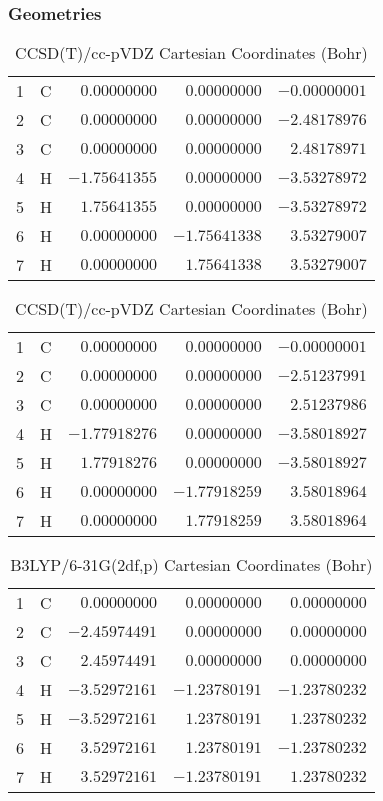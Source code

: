 \documentclass[10pt,oneside]{article}
\begin{document}
\begin{table}[h!]
\subsubsection*{Geometries}
\begin{multicols}{2}
\centering
\caption{CCSD(T)/cc-pVTZ Cartesian Coordinates (Bohr)}
\begin{tabular}{llrrr}
\toprule
1  & C  & $ 0.00000000$ & $ 0.00000000$ & $-0.00000001$ \\
2  & C  & $ 0.00000000$ & $ 0.00000000$ & $-2.48178976$ \\
3  & C  & $ 0.00000000$ & $ 0.00000000$ & $ 2.48178971$ \\
4  & H  & $-1.75641355$ & $ 0.00000000$ & $-3.53278972$ \\
5  & H  & $ 1.75641355$ & $ 0.00000000$ & $-3.53278972$ \\
6  & H  & $ 0.00000000$ & $-1.75641338$ & $ 3.53279007$ \\
7  & H  & $ 0.00000000$ & $ 1.75641338$ & $ 3.53279007$ \\
\bottomrule
\end{tabular}
\caption{CCSD(T)/cc-pVDZ Cartesian Coordinates (Bohr)}
\begin{tabular}{llrrr}
\toprule
1  & C  & $ 0.00000000$ & $ 0.00000000$ & $-0.00000001$ \\
2  & C  & $ 0.00000000$ & $ 0.00000000$ & $-2.51237991$ \\
3  & C  & $ 0.00000000$ & $ 0.00000000$ & $ 2.51237986$ \\
4  & H  & $-1.77918276$ & $ 0.00000000$ & $-3.58018927$ \\
5  & H  & $ 1.77918276$ & $ 0.00000000$ & $-3.58018927$ \\
6  & H  & $ 0.00000000$ & $-1.77918259$ & $ 3.58018964$ \\
7  & H  & $ 0.00000000$ & $ 1.77918259$ & $ 3.58018964$ \\
\bottomrule
\end{tabular}
\end{multicols}
\end{table}

\begin{table}[h]
\centering
\caption{B3LYP/6-31G(2df,p) Cartesian Coordinates (Bohr)}
\begin{tabular}{llrrr}
\toprule
1  & C  & $ 0.00000000$ & $ 0.00000000$ & $ 0.00000000$ \\
2  & C  & $-2.45974491$ & $ 0.00000000$ & $ 0.00000000$ \\
3  & C  & $ 2.45974491$ & $ 0.00000000$ & $ 0.00000000$ \\
4  & H  & $-3.52972161$ & $-1.23780191$ & $-1.23780232$ \\
5  & H  & $-3.52972161$ & $ 1.23780191$ & $ 1.23780232$ \\
6  & H  & $ 3.52972161$ & $ 1.23780191$ & $-1.23780232$ \\
7  & H  & $ 3.52972161$ & $-1.23780191$ & $ 1.23780232$ \\
\bottomrule
\end{tabular}
\end{table}
\end{document}
